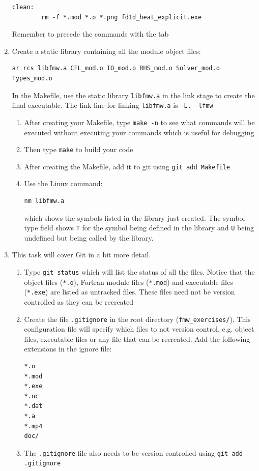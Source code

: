 \documentclass[12pt]{article}
\begin{document}
\begin{enumerate}
\begin{verbatim}
clean:
        rm -f *.mod *.o *.png fd1d_heat_explicit.exe
\end{verbatim}
Remember to precede the commands with the tab
\item Create a static library containing all the module object files:
\begin{verbatim}
ar rcs libfmw.a CFL_mod.o IO_mod.o RHS_mod.o Solver_mod.o Types_mod.o
\end{verbatim}
In the Makefile, use the static library \texttt{libfmw.a} in the link stage to create the final executable. The link line for
linking \texttt{libfmw.a} is \texttt{-L. -lfmw}
\begin{enumerate}
\item After creating your Makefile, type \texttt{make -n} to see what commands will be executed without executing
your commands which is useful for debugging
\item Then type \texttt{make} to build your code 
\item After creating the Makefile, add it to git using \texttt{git add Makefile}
\item Use the Linux command: 
\begin{verbatim}
nm libfmw.a
\end{verbatim}
which shows the symbols listed in the library just created. The symbol type field shows \texttt{T} for the symbol being 
defined in the library and \texttt{U} being undefined but being called by the library. 
\end{enumerate}
\item This task will cover Git in a bit more detail.
\begin{enumerate}
\item Type \texttt{git status} which will list the status of all the files. Notice that the object 
files (\texttt{*.o}), Fortran module files (\texttt{*.mod}) and executable files (\texttt{*.exe}) are listed as 
untracked files. These files need not be version controlled as they can be recreated
\item Create the file \texttt{.gitignore} in the root directory (\texttt{fmw\_exercises/}). This configuration file will 
specify which files to not version control, e.g. object files, executable files or any file that can
be recreated. Add the following extensions in the ignore file:
\begin{verbatim}
*.o
*.mod
*.exe
*.nc
*.dat
*.a
*.mp4
doc/
\end{verbatim}
\item The \texttt{.gitignore} file also needs to be version controlled using \texttt{git add .gitignore}

\end{enumerate}
\end{enumerate}
\end{document}
